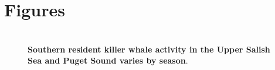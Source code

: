 \documentclass{article}
\begin{document}
\section* {Figures}

\begin{figure}[p]
\includegraphics{../analyses/figures/OrcaPhenPlots/srkw_phenmap.pdf} 
\caption{\textbf{Southern resident killer whale activity in the Upper Salish Sea and Puget Sound varies by season}. }
 \label{fig:phenplot}
 \end{figure}
 

 
 
\end{document}
